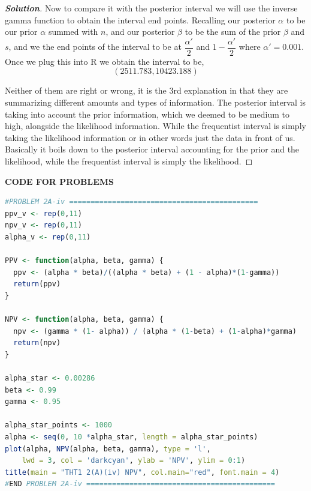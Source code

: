 \documentclass[12pt]{article}
\newenvironment{solution}{\begin{proof}[\textbf{\textit{Solution}}] }{\end{proof}}
\begin{document}
\begin{itemize}
\begin{itemize}
\begin{itemize}
\begin{tcolorbox}[breakable]
\begin{solution}
        Now to compare it with the posterior interval we will use the inverse gamma function to obtain the interval end points. Recalling our posterior $\alpha$ to be our prior $\alpha$ summed with $n$, and our posterior $\beta$ to be the sum of the prior $\beta$ and $s$, and we the end points of the interval to be at $\dfrac{\alpha'}{2}$ and $1 - \dfrac{\alpha'}{2}$ where $\alpha' = 0.001$. Once we plug this into R we obtain the interval to be,
        \[(2511.783, 10423.188)\]
    
        Neither of them are right or wrong, it is the 3rd explanation in that they are summarizing different amounts and types of information. The posterior interval is taking into account the prior information, which we deemed to be medium to high, alongside the likelihood information. While the frequentist interval is simply taking the likelihood information or in other words just the data in front of us. Basically it boils down to the posterior interval accounting for the prior and the likelihood, while the frequentist interval is simply the likelihood. 
    \end{solution}
\end{tcolorbox}


\end{itemize}

\end{itemize}

\end{itemize}

\newpage
\textbf{CODE FOR PROBLEMS}
\begin{lstlisting}[language = R]
#PROBLEM 2A-iv ============================================   
ppv_v <- rep(0,11)
npv_v <- rep(0,11)
alpha_v <- rep(0,11)

PPV <- function(alpha, beta, gamma) {
  ppv <- (alpha * beta)/((alpha * beta) + (1 - alpha)*(1-gamma))  
  return(ppv)
}

NPV <- function(alpha, beta, gamma) {
  npv <- (gamma * (1- alpha)) / (alpha * (1-beta) + (1-alpha)*gamma)
  return(npv)
}
  
alpha_star <- 0.00286
beta <- 0.99
gamma <- 0.95

alpha_star_points <- 1000
alpha <- seq(0, 10 *alpha_star, length = alpha_star_points)
plot(alpha, NPV(alpha, beta, gamma), type = 'l', 
    lwd = 3, col = 'darkcyan', ylab = 'NPV', ylim = 0:1)
title(main = "THT1 2(A)(iv) NPV", col.main="red", font.main = 4)
#END PROBLEM 2A-iv ============================================  
\end{lstlisting}
\end{document}
